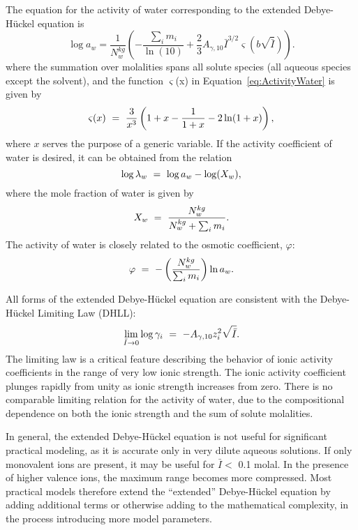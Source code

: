The equation for the activity of water corresponding to the extended
Debye-H\"{u}ckel equation is
%
\begin{equation}  \label{eq:ActivityWater}
  \log a_{w} = \frac{1}{N_{w}^{kg} } 
                 \left( - \frac{\sum _{i}m_{i}}{\ln(10)} 
                        + \frac{2}{3} A_{\gamma ,10} \bar{I}^{3/2}
                          \varsigma(b\sqrt{\bar{I}})
                 \right).
\end{equation}
%
where the summation over molalities spans all solute
species (all aqueous species except the solvent), and the function
$\varsigma $(x) in Equation~\eqref{eq:ActivityWater} is given by
\begin{equation}
  \varsigma (x) \ =\  \frac{3}{x^{3} } \left(1+x-\frac{1}{1+x} -2\ln (1+x)\right),
\end{equation}
where $x$ serves the purpose of a generic variable.
If the activity coefficient of water is desired, it can be obtained
from the relation
%
\begin{equation}
   \log \lambda _{w} \ =\  \log a_{w} -\log (X_{w} ),
\end{equation}
%
where the mole fraction of water is given by
%
\begin{equation}
   X_{w} \ =\  \frac{N_{w}^{kg} }{N_{w}^{kg} +\sum _{i}m_{i}  } .
\end{equation}
%
The activity of water is closely related to the osmotic coefficient, $\varphi$:
%
\begin{equation}
   \varphi \ =\  -\left(\frac{N_{w}^{kg} }{\sum _{i}m_{i}  } \right)\ln a_{w} .
\end{equation}

All forms of the extended Debye-H\"{u}ckel equation are consistent with
the Debye-H\"{u}ckel Limiting Law (DHLL):
%
\begin{equation}
   \lim \limits_{\bar{I}\to 0} \log \gamma _{i} \ =\  -A_{\gamma ,10} z_{i}^{2} \sqrt{\bar{I}}.
\end{equation}
%
The limiting law is a critical feature describing the behavior of
ionic activity coefficients in the range of very low ionic strength.
The ionic activity coefficient plunges rapidly from unity as ionic
strength increases from zero. There is no comparable limiting relation
for the activity of water, due to the compositional dependence on both
the ionic strength and the sum of solute molalities.

In general, the extended Debye-H\"{u}ckel equation is not useful for
significant practical modeling, as it is accurate only in very dilute aqueous
solutions. If only monovalent ions are present, it may be useful for
$\bar{I} < $ 0.1 molal. In the presence of higher valence ions, the
maximum range becomes more compressed. Most practical models therefore
extend the ``extended'' Debye-H\"{u}ckel equation by adding additional
terms or otherwise adding to the mathematical complexity, in the
process introducing more model parameters.

